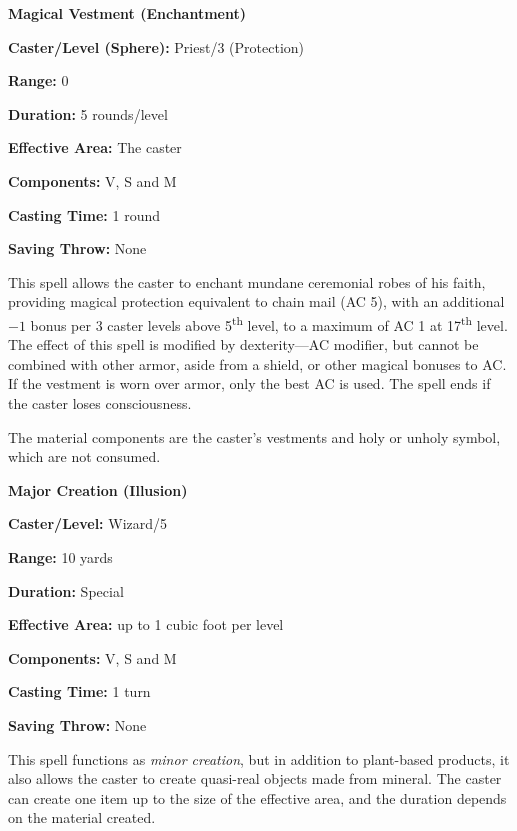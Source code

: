 \begin{multicols}{2}
\begin{minipage}{\columnwidth}
\noindent \textbf{Magical Vestment (Enchantment)}

\noindent \textbf{Caster/Level (Sphere):} Priest/3 (Protection)

\noindent \textbf{Range:} 0

\noindent \textbf{Duration:} 5 rounds/level

\noindent \textbf{Effective Area:} The caster

\noindent \textbf{Components:} V, S and M

\noindent \textbf{Casting Time:} 1 round

\noindent \textbf{Saving Throw:} None

\end{minipage}

This spell allows the caster to enchant mundane ceremonial robes of his faith, providing magical protection equivalent to chain mail (AC 5), with an additional $-1$ bonus per 3 caster levels above 5\textsuperscript{th} level, to a maximum of AC 1 at 17\textsuperscript{th} level.  The effect of this spell is modified by dexterity---AC modifier, but cannot be combined with other armor, aside from a shield, or other magical bonuses to AC.  If the vestment is worn over armor, only the best AC is used.  The spell ends if the caster loses consciousness.  

The material components are the caster's vestments and holy or unholy symbol, which are not consumed.

\vspace{1em}

\noindent
\begin{minipage}{\columnwidth}

\noindent \textbf{Major Creation (Illusion)}

\noindent \textbf{Caster/Level:} Wizard/5

\noindent \textbf{Range:} 10 yards

\noindent \textbf{Duration:} Special

\noindent \textbf{Effective Area:} up to 1 cubic foot per level

\noindent \textbf{Components:} V, S and M

\noindent \textbf{Casting Time:} 1 turn

\noindent \textbf{Saving Throw:} None

\end{minipage}

This spell functions as \textit{minor creation}, but in addition to plant-based products, it also allows the caster to create quasi-real objects made from mineral.  The caster can create one item up to the size of the effective area, and the duration depends on the material created.


\end{multicols}
